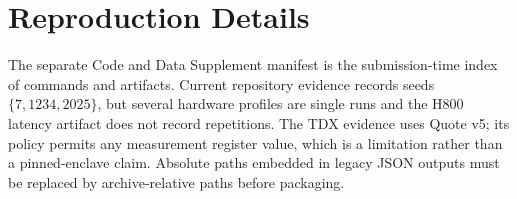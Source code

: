 \section{Reproduction Details}
\label{app:repro}

The separate Code and Data Supplement manifest is the submission-time index of
commands and artifacts. Current repository evidence records seeds
$\{7,1234,2025\}$, but several hardware profiles are single runs and the H800
latency artifact does not record repetitions. The TDX evidence uses Quote v5;
its policy permits any measurement register value, which is a limitation rather
than a pinned-enclave claim. Absolute paths embedded in legacy JSON outputs must
be replaced by archive-relative paths before packaging.
